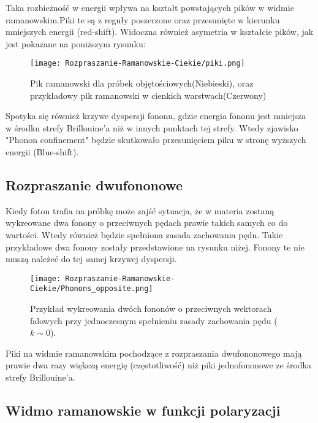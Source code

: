 Taka rozbieżność w energii wpływa na kształt powstających pików w widmie ramanowskim.Piki te są z reguły poszerzone oraz przesunięte w kierunku mniejszych energii (red-shift). Widoczna również asymetria w kształcie pików, jak jest pokazane na poniższym rysunku:

\begin{figure}[H]
	\begin{center}
		\texttt{[image: Rozpraszanie-Ramanowskie-Ciekie/piki.png]}
		\caption{Pik ramanowski dla próbek objętościowych(Niebieski), oraz przykładowy pik ramanowski w cienkich warstwach(Czerwony)}
	\end{center}
\end{figure}

Spotyka się również krzywe dyspersji fononu, gdzie energia fononu jest mniejsza w środku strefy Brillouine'a niż w innych punktach tej strefy. Wtedy zjawisko "Phonon confinement" będzie skutkowało przesunięciem piku w stronę wyższych energii (Blue-shift).

\subsection{Rozpraszanie dwufononowe}
Kiedy foton trafia na próbkę może zajść sytuacja, że w materia zostaną wykreowane dwa fonony o przeciwnych pędach prawie takich samych co do wartości. Wtedy również będzie spełniona zasada zachowania pędu. Takie przykładowe dwa fonony zostały przedstawione na rysunku niżej. Fonony te nie muszą należeć do tej samej krzywej dyspersji. 
 
\begin{figure}[H]
	\begin{center}
		\texttt{[image: Rozpraszanie-Ramanowskie-Ciekie/Phonons\_opposite.png]}
		\caption{Przykład wykreowania dwóch fononów o przeciwnych wektorach falowych przy jednoczesnym spełnieniu zasady zachowania pędu ($k \sim 0$).}
	\end{center}
\end{figure}

Piki na widmie ramanowskim pochodzące z rozpraszania dwufononowego mają prawie dwa razy większą energię (częstotliwość) niż piki jednofononowe ze środka strefy Brillouine'a.

\subsection{Widmo ramanowskie w funkcji polaryzacji}

